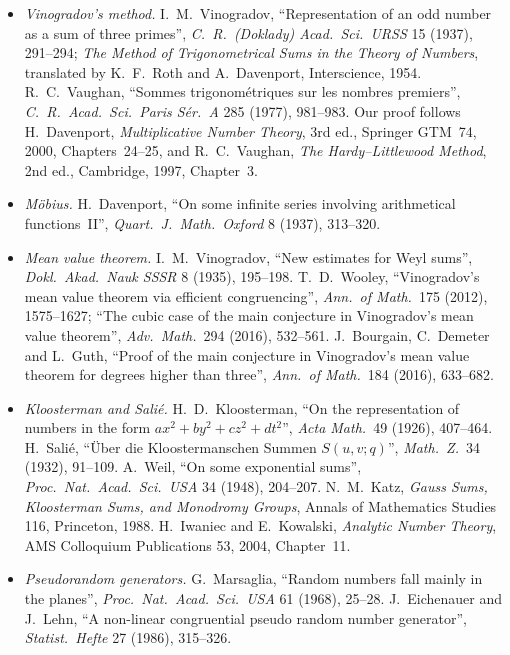 \begin{itemize}
\item \emph{Vinogradov's method.} I.~M.~Vinogradov, ``Representation of an odd number as a sum of three primes'', \emph{C.\ R.\ (Doklady) Acad.\ Sci.\ URSS} 15 (1937), 291--294; \emph{The Method of Trigonometrical Sums in the Theory of Numbers}, translated by K.~F.~Roth and A.~Davenport, Interscience, 1954. R.~C.~Vaughan, ``Sommes trigonométriques sur les nombres premiers'', \emph{C.\ R.\ Acad.\ Sci.\ Paris Sér.\ A} 285 (1977), 981--983. Our proof follows H.~Davenport, \emph{Multiplicative Number Theory}, 3rd ed., Springer GTM~74, 2000, Chapters~24--25, and R.~C.~Vaughan, \emph{The Hardy--Littlewood Method}, 2nd ed., Cambridge, 1997, Chapter~3.
\item \emph{Möbius.} H.~Davenport, ``On some infinite series involving arithmetical functions~II'', \emph{Quart.\ J.\ Math.\ Oxford} 8 (1937), 313--320.
\item \emph{Mean value theorem.} I.~M.~Vinogradov, ``New estimates for Weyl sums'', \emph{Dokl.\ Akad.\ Nauk SSSR} 8 (1935), 195--198. T.~D.~Wooley, ``Vinogradov's mean value theorem via efficient congruencing'', \emph{Ann.\ of Math.}\ 175 (2012), 1575--1627; ``The cubic case of the main conjecture in Vinogradov's mean value theorem'', \emph{Adv.\ Math.}\ 294 (2016), 532--561. J.~Bourgain, C.~Demeter and L.~Guth, ``Proof of the main conjecture in Vinogradov's mean value theorem for degrees higher than three'', \emph{Ann.\ of Math.}\ 184 (2016), 633--682.
\item \emph{Kloosterman and Salié.} H.~D.~Kloosterman, ``On the representation of numbers in the form $ax^2+by^2+cz^2+dt^2$'', \emph{Acta Math.}\ 49 (1926), 407--464. H.~Salié, ``Über die Kloostermanschen Summen $S(u,v;q)$'', \emph{Math.\ Z.}\ 34 (1932), 91--109. A.~Weil, ``On some exponential sums'', \emph{Proc.\ Nat.\ Acad.\ Sci.\ USA} 34 (1948), 204--207. N.~M.~Katz, \emph{Gauss Sums, Kloosterman Sums, and Monodromy Groups}, Annals of Mathematics Studies 116, Princeton, 1988. H.~Iwaniec and E.~Kowalski, \emph{Analytic Number Theory}, AMS Colloquium Publications 53, 2004, Chapter~11.
\item \emph{Pseudorandom generators.} G.~Marsaglia, ``Random numbers fall mainly in the planes'', \emph{Proc.\ Nat.\ Acad.\ Sci.\ USA} 61 (1968), 25--28. J.~Eichenauer and J.~Lehn, ``A non-linear congruential pseudo random number generator'', \emph{Statist.\ Hefte} 27 (1986), 315--326.
\end{itemize}
